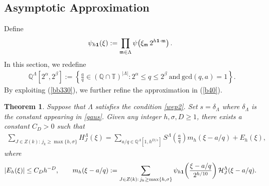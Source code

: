 \documentclass[11 pt,letterpaper]{amsart}
\theoremstyle{plain}
\newtheorem{theorem}{Theorem}\numberwithin{theorem}{section}
\theoremstyle{definition}
\theoremstyle{remark} \theoremstyle{exam} \theoremstyle{ob}
\numberwithin{equation}{section}
\begin{document}
\subsection{Asymptotic Approximation}
Define
\[
\psi_{h{\bf 1}}(\xi):= \prod_{\mathfrak{m}\in \Lambda}
\psi\!\left(  \xi_{\mathfrak{m}}\, 2^{h {\bf 1}\cdot \mathfrak{m}}   \right).
\] In this section, we redefine  	\begin{align*} 
	\ \ \mathbb{Q}^{\Lambda}[2^{\alpha},2^{\beta}]:=  \left\{\frac{a}{q}\in   (\mathbb{Q}\cap \mathbb{T})^{|\Lambda|}: 2^{\alpha}\le q \le 2^{\beta}\ \text{and}\  \text{gcd}(q,a)=1\right\}.
\end{align*}
By exploiting (\ref{bb330}), we further refine the approximation in (\ref{b40}).

\begin{theorem}\label{IW3}  
Suppose that $\Lambda$ satisfies the condition   \eqref{wep2}. Set $s=\delta_{\Lambda}$ where $\delta_{\Lambda}$ is the constant appearing in \eqref{gaus}.
Given any integer $h,\sigma,D \ge 1$,  there exists a constant $C_D>0$ such that
\begin{align}\label{IW5}
\sum_{J\in Z(k):\, j_k\ge \max\{h,\sigma\}} H^{\Lambda}_{J}(\xi)
= \sum_{a/q\in \mathbb{Q}^{\Lambda}[1,h^{D/s}]} S^{\Lambda}\!\left(\frac{a}{q}\right) m_{h}( \xi -a/q)  +E_{h}(\xi),
\end{align}
where
\begin{align*}
\left|E_{h}(\xi)\right| \leq C_{D} h^{-D},
\qquad 
m_{h}( \xi-a/q )
:=  \sum_{J \in Z(k):\, j_k\ge \max\{h,\sigma\}}  
\psi_{h{\bf 1}}\!\left(\frac{\xi-a/q}{2^{h/10}}\right)\mathcal{H}^\Lambda_{J}(\xi-a/q).
\end{align*}
\end{theorem}
\end{document}
